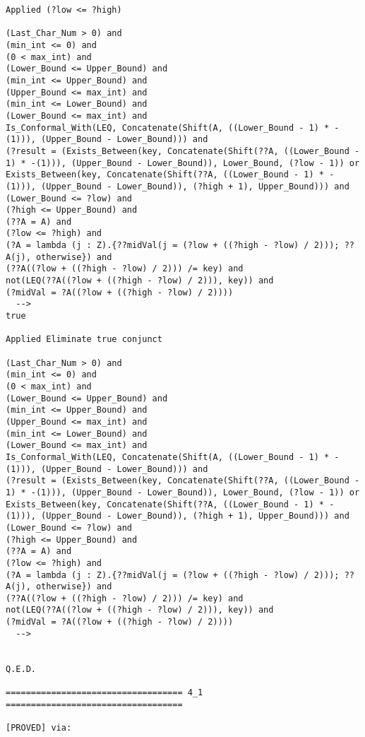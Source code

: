 \begin{lstlisting}[language=resolve]
Applied (?low <= ?high)

(Last_Char_Num > 0) and
(min_int <= 0) and
(0 < max_int) and
(Lower_Bound <= Upper_Bound) and
(min_int <= Upper_Bound) and
(Upper_Bound <= max_int) and
(min_int <= Lower_Bound) and
(Lower_Bound <= max_int) and
Is_Conformal_With(LEQ, Concatenate(Shift(A, ((Lower_Bound - 1) * -(1))), (Upper_Bound - Lower_Bound))) and
(?result = (Exists_Between(key, Concatenate(Shift(??A, ((Lower_Bound - 1) * -(1))), (Upper_Bound - Lower_Bound)), Lower_Bound, (?low - 1)) or Exists_Between(key, Concatenate(Shift(??A, ((Lower_Bound - 1) * -(1))), (Upper_Bound - Lower_Bound)), (?high + 1), Upper_Bound))) and
(Lower_Bound <= ?low) and
(?high <= Upper_Bound) and
(??A = A) and
(?low <= ?high) and
(?A = lambda (j : Z).{??midVal(j = (?low + ((?high - ?low) / 2))); ??A(j), otherwise}) and
(??A((?low + ((?high - ?low) / 2))) /= key) and
not(LEQ(??A((?low + ((?high - ?low) / 2))), key)) and
(?midVal = ?A((?low + ((?high - ?low) / 2))))
  -->
true

Applied Eliminate true conjunct

(Last_Char_Num > 0) and
(min_int <= 0) and
(0 < max_int) and
(Lower_Bound <= Upper_Bound) and
(min_int <= Upper_Bound) and
(Upper_Bound <= max_int) and
(min_int <= Lower_Bound) and
(Lower_Bound <= max_int) and
Is_Conformal_With(LEQ, Concatenate(Shift(A, ((Lower_Bound - 1) * -(1))), (Upper_Bound - Lower_Bound))) and
(?result = (Exists_Between(key, Concatenate(Shift(??A, ((Lower_Bound - 1) * -(1))), (Upper_Bound - Lower_Bound)), Lower_Bound, (?low - 1)) or Exists_Between(key, Concatenate(Shift(??A, ((Lower_Bound - 1) * -(1))), (Upper_Bound - Lower_Bound)), (?high + 1), Upper_Bound))) and
(Lower_Bound <= ?low) and
(?high <= Upper_Bound) and
(??A = A) and
(?low <= ?high) and
(?A = lambda (j : Z).{??midVal(j = (?low + ((?high - ?low) / 2))); ??A(j), otherwise}) and
(??A((?low + ((?high - ?low) / 2))) /= key) and
not(LEQ(??A((?low + ((?high - ?low) / 2))), key)) and
(?midVal = ?A((?low + ((?high - ?low) / 2))))
  -->


Q.E.D.

=================================== 4_1 ===================================

[PROVED] via:


\end{lstlisting}
